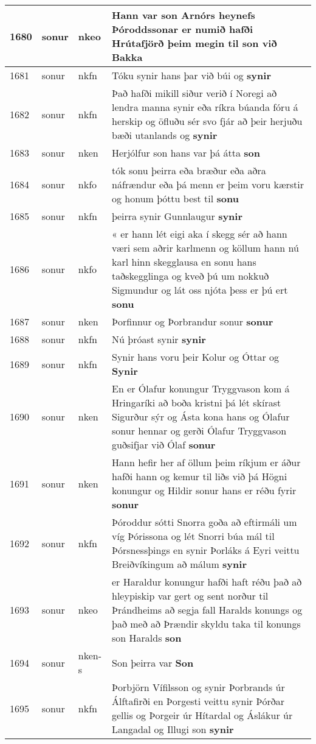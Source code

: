 \documentclass{article}
\begin{document}
\begin{longtable}{p{1cm}|p{1cm}|p{1cm}|p{13cm}}
1680&sonur&nkeo&Hann var son Arnórs heynefs Þóroddssonar er numið hafði Hrútafjörð þeim megin til \textbf{son} við Bakka\\
\hline
1681&sonur&nkfn&Tóku synir hans þar við búi og \textbf{synir} \\
\hline
1682&sonur&nkfn&Það hafði mikill siður verið í Noregi að lendra manna synir eða ríkra búanda fóru á herskip og öfluðu sér svo fjár að þeir herjuðu bæði utanlands og \textbf{synir} \\
\hline
1683&sonur&nken&Herjólfur son hans var þá átta \textbf{son} \\
\hline
1684&sonur&nkfo&tók sonu þeirra eða bræður eða aðra náfrændur eða þá menn er þeim voru kærstir og honum þóttu best til \textbf{sonu} \\
\hline
1685&sonur&nkfn&þeirra synir Gunnlaugur \textbf{synir} \\
\hline
1686&sonur&nkfo&« er hann lét eigi aka í skegg sér að hann væri sem aðrir karlmenn og köllum hann nú karl hinn skegglausa en sonu hans taðskegglinga og kveð þú um nokkuð Sigmundur og lát oss njóta þess er þú ert \textbf{sonu} \\
\hline
1687&sonur&nken&Þorfinnur og Þorbrandur sonur \textbf{sonur} \\
\hline
1688&sonur&nkfn&Nú þróast synir \textbf{synir} \\
\hline
1689&sonur&nkfn&Synir hans voru þeir Kolur og Óttar og \textbf{Synir} \\
\hline
1690&sonur&nken&En er Ólafur konungur Tryggvason kom á Hringaríki að boða kristni þá lét skírast Sigurður sýr og Ásta kona hans og Ólafur sonur hennar og gerði Ólafur Tryggvason guðsifjar við Ólaf \textbf{sonur} \\
\hline
1691&sonur&nken&Hann hefir her af öllum þeim ríkjum er áður hafði hann og kemur til liðs við þá Högni konungur og Hildir sonur hans er réðu fyrir \textbf{sonur} \\
\hline
1692&sonur&nkfn&Þóroddur sótti Snorra goða að eftirmáli um víg Þórissona og lét Snorri búa mál til Þórsnessþings en synir Þorláks á Eyri veittu Breiðvíkingum að málum \textbf{synir} \\
\hline
1693&sonur&nkeo&er Haraldur konungur hafði haft réðu það að hleypiskip var gert og sent norður til Þrándheims að segja fall Haralds konungs og það með að Þrændir skyldu taka til konungs son Haralds \textbf{son} \\
\hline
1694&sonur&nken-s&Son þeirra var \textbf{Son} \\
\hline
1695&sonur&nkfn&Þorbjörn Vífilsson og synir Þorbrands úr Álftafirði en Þorgesti veittu synir Þórðar gellis og Þorgeir úr Hítardal og Áslákur úr Langadal og Illugi son \textbf{synir} \\

\end{longtable}
\end{document}

